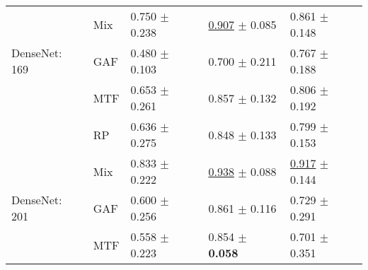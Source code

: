 \begin{tabular}{lllll}
 & Mix & \textcolor[rgb]{0.3509571559,0.5000000000,0}{0.750} $\pm$ \textcolor[rgb]{0.8681986203,0.1318013797,0}{0.238} & \underline{\textcolor[rgb]{0.1467710372,0.5000000000,0}{0.907}} $\pm$ \textcolor[rgb]{0.1743396851,0.5000000000,0}{0.085} & \textcolor[rgb]{0.4651162791,0.5000000000,0}{0.861} $\pm$ \textcolor[rgb]{0.4217271436,0.5000000000,0}{0.148} \\
DenseNet: 169 & GAF & \textcolor[rgb]{1.0000000000,0.0000000000,0}{0.480} $\pm$ \textcolor[rgb]{0.3750153542,0.5000000000,0}{0.103} & \textcolor[rgb]{1.0000000000,0.0000000000,0}{0.700} $\pm$ \textcolor[rgb]{1.0000000000,0.0000000000,0}{0.211} & \textcolor[rgb]{0.7813953488,0.2186046512,0}{0.767} $\pm$ \textcolor[rgb]{0.5347281177,0.4652718823,0}{0.188} \\
 & MTF & \textcolor[rgb]{0.5849285931,0.4150714069,0}{0.653} $\pm$ \textcolor[rgb]{0.9495951119,0.0504048881,0}{0.261} & \textcolor[rgb]{0.3522504892,0.5000000000,0}{0.857} $\pm$ \textcolor[rgb]{0.4821490246,0.5000000000,0}{0.132} & \textcolor[rgb]{0.6511627907,0.3488372093,0}{0.806} $\pm$ \textcolor[rgb]{0.5486194730,0.4513805270,0}{0.192} \\
 & RP & \textcolor[rgb]{0.6244302644,0.3755697356,0}{0.636} $\pm$ \textcolor[rgb]{1.0000000000,0.0000000000,0}{0.275} & \textcolor[rgb]{0.3913894325,0.5000000000,0}{0.848} $\pm$ \textcolor[rgb]{0.4943543354,0.5000000000,0}{0.133} & \textcolor[rgb]{0.6744186047,0.3255813953,0}{0.799} $\pm$ \textcolor[rgb]{0.4351978611,0.5000000000,0}{0.153} \\
 & Mix & \textcolor[rgb]{0.1504102097,0.5000000000,0}{0.833} $\pm$ \textcolor[rgb]{0.8082489293,0.1917510707,0}{0.222} & \underline{\textcolor[rgb]{0.0213485145,0.5000000000,0}{0.938}} $\pm$ \textcolor[rgb]{0.1994619916,0.5000000000,0}{0.088} & \underline{\textcolor[rgb]{0.2790697674,0.5000000000,0}{0.917}} $\pm$ \textcolor[rgb]{0.4114646048,0.5000000000,0}{0.144} \\
DenseNet: 201 & GAF & \textcolor[rgb]{0.7119416591,0.2880583409,0}{0.600} $\pm$ \textcolor[rgb]{0.9318485438,0.0681514562,0}{0.256} & \textcolor[rgb]{0.3344600605,0.5000000000,0}{0.861} $\pm$ \textcolor[rgb]{0.3774431799,0.5000000000,0}{0.116} & \textcolor[rgb]{0.9069767442,0.0930232558,0}{0.729} $\pm$ \textcolor[rgb]{0.8299131753,0.1700868247,0}{0.291} \\
 & MTF & \textcolor[rgb]{0.8122151322,0.1877848678,0}{0.558} $\pm$ \textcolor[rgb]{0.8138252624,0.1861747376,0}{0.223} & \textcolor[rgb]{0.3639921722,0.5000000000,0}{0.854} $\pm$ \textbf{\textcolor[rgb]{0.0000000000,0.5000000000,0}{0.058}} & \textcolor[rgb]{1.0000000000,0.0000000000,0}{0.701} $\pm$ \textcolor[rgb]{1.0000000000,0.0000000000,0}{0.351} \\

\end{tabular}
